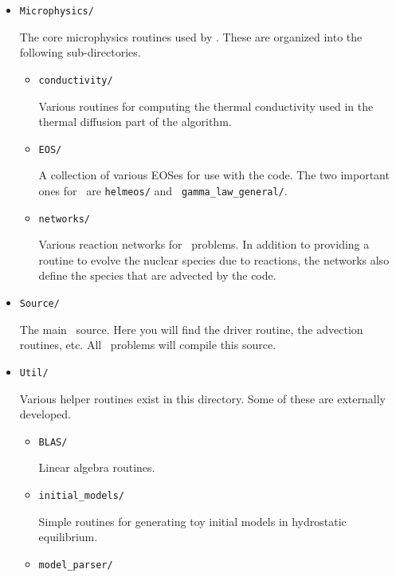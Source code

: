 \begin{itemize}
\begin{itemize}
\begin{itemize}
    \end{itemize}

  \item {\tt Microphysics/}

    The core microphysics routines used by \maestro.  These are organized
    into the following sub-directories.

    \begin{itemize}
    \item {\tt conductivity/}

      Various routines for computing the thermal conductivity used in
      the thermal diffusion part of the algorithm.

    \item {\tt EOS/}

      A collection of various EOSes for use with the code.  The two
      important ones for \maestro\ are {\tt helmeos/} and {\tt
        gamma\_law\_general/}.

    \item {\tt networks/}

      Various reaction networks for \maestro\ problems.  In addition
      to providing a routine to evolve the nuclear species due to
      reactions, the networks also define the species that are
      advected by the code.

    \end{itemize}


  \item {\tt Source/}

    The main \maestro\ source.  Here you will find the driver routine,
    the advection routines, etc.  All \maestro\ problems will compile
    this source.


  \item {\tt Util/}

    Various helper routines exist in this directory.  Some of these
    are externally developed.

    \begin{itemize}

    \item {\tt BLAS/}

      Linear algebra routines.

    \item {\tt initial\_models/}

      Simple routines for generating toy initial models in hydrostatic equilibrium.

    \item {\tt model\_parser/}


\end{itemize}
\end{itemize}
\end{itemize}
